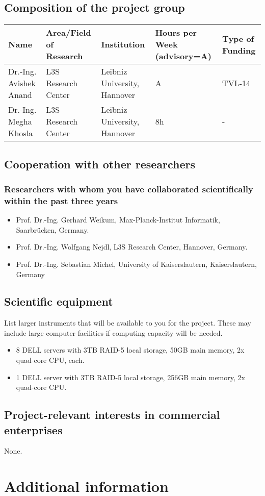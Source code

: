 \subsection{Composition of the project group}
\small
\begin{tabular}{|p{}|p{}|p{}|p{}|p{}|} \hline 
{\bf Name} & {\bf Area/Field of \newline Research} & {\bf Institution} & {\bf Hours per Week \newline (advisory=A)} & {\bf Type of \newline Funding}\\ \hline \hline
Dr.-Ing. Avishek Anand & L3S Research Center & Leibniz University, Hannover  & A & TVL-14 \\ \hline
Dr.-Ing. Megha Khosla & L3S Research Center & Leibniz University, Hannover & 8h & - \\ \hline
\end{tabular}

\subsection{Cooperation with other researchers}

	\subsubsection{Researchers with whom you have collaborated scientifically within the past three years}

	\begin{itemize}
		\item Prof. Dr.-Ing. Gerhard Weikum, Max-Planck-Institut Informatik, Saarbr{\"u}cken, Germany.
		\item Prof. Dr.-Ing. Wolfgang Nejdl, L3S Research Center, Hannover, Germany.
		\item Prof. Dr.-Ing. Sebastian Michel, University of Kaiserslautern, Kaiserslautern, Germany
	\end{itemize}

\subsection{Scientific equipment}
		List larger instruments that will be available to you for the project. 
		These may include large computer facilities if computing capacity will be needed. 

\begin{itemize}
\item 8 DELL servers with 3TB RAID-5 local storage, 50GB main memory, 2x quad-core CPU, each.
\item 1 DELL server with 3TB RAID-5 local storage, 256GB main memory,  2x quad-core CPU.
\end{itemize}


\subsection{Project-relevant interests in commercial enterprises}

None.

\section{Additional information}

